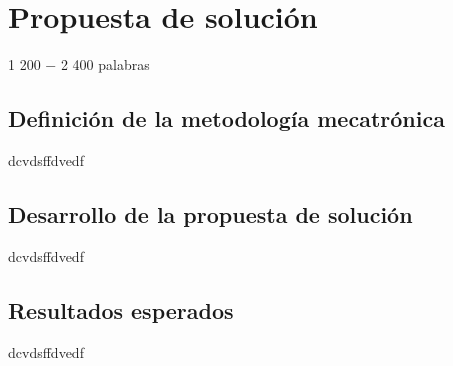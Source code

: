 \section{Propuesta de solución}
\label{Propuesta de solución}
1 200 − 2 400 palabras\\

\subsection{Definición de la metodología mecatrónica}
dcvdsffdvedf\\

\subsection{Desarrollo de la propuesta de solución}
dcvdsffdvedf\\

\subsection{Resultados esperados}
dcvdsffdvedf\\

